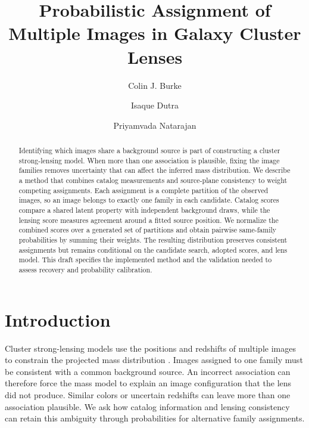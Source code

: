 \documentclass[twocolumn,twocolappendix,linenumbers]{aastex701}
\begin{document}
\title{Probabilistic Assignment of Multiple Images in Galaxy Cluster Lenses}

\author[0000-0001-9947-6911]{Colin J. Burke}

\author[0000-0001-7040-4930]{Isaque Dutra}

\author[0000-0002-5554-8896]{Priyamvada Natarajan}

\begin{abstract}
\end{abstract}


\begin{abstract}
Identifying which images share a background source is part of constructing a cluster strong-lensing model.
When more than one association is plausible, fixing the image families removes uncertainty that can affect the inferred mass distribution.
We describe a method that combines catalog measurements and source-plane consistency to weight competing assignments.
Each assignment is a complete partition of the observed images, so an image belongs to exactly one family in each candidate.
Catalog scores compare a shared latent property with independent background draws, while the lensing score measures agreement around a fitted source position.
We normalize the combined scores over a generated set of partitions and obtain pairwise same-family probabilities by summing their weights.
The resulting distribution preserves consistent assignments but remains conditional on the candidate search, adopted scores, and lens model.
This draft specifies the implemented method and the validation needed to assess recovery and probability calibration.
\end{abstract}

\section{Introduction}
\label{sec:introduction}
Cluster strong-lensing models use the positions and redshifts of multiple images to constrain the projected mass distribution \citep{Jullo2007}.
Images assigned to one family must be consistent with a common background source.
An incorrect association can therefore force the mass model to explain an image configuration that the lens did not produce.
Similar colors or uncertain redshifts can leave more than one association plausible.
We ask how catalog information and lensing consistency can retain this ambiguity through probabilities for alternative family assignments.
\end{document}
